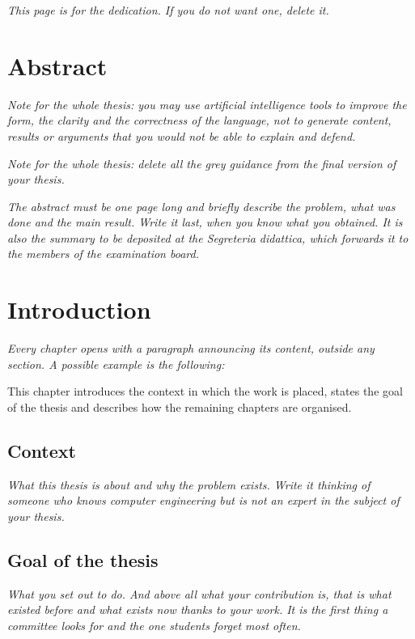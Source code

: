 \documentclass[12pt,a4paper,oneside]{report}
\newcommand{\guida}[1]{{\itshape\color{gray}#1\par}}
\newcommand{\esempio}[1]{#1\par}
\begin{document}


\thispagestyle{empty}
\guida{This page is for the dedication. If you do not want one, delete it.}
\clearpage
\setcounter{page}{1}

\tableofcontents
\listoffigures
\listoftables

\chapter*{Abstract}
\guida{Note for the whole thesis: you may use artificial intelligence tools to improve the form, the clarity and the correctness of the language, not to generate content, results or arguments that you would not be able to explain and defend.}
\guida{Note for the whole thesis: delete all the grey guidance from the final
version of your thesis.}
\guida{The abstract must be one page long and briefly describe the problem, what was done and the main result. Write it last, when you know what you obtained. It is also the summary to be deposited at the Segreteria didattica, which forwards it to the members of the examination board.}

\chapter{Introduction}
\guida{Every chapter opens with a paragraph announcing its content, outside
any section. A possible example is the following:}
\esempio{This chapter introduces the context in which the work is placed,
states the goal of the thesis and describes how the remaining chapters are
organised.}

\section{Context}
\guida{What this thesis is about and why the problem exists. Write it thinking of someone
who knows computer engineering but is not an expert in the subject of your
thesis.}

\section{Goal of the thesis}
\guida{What you set out to do. And above all what your contribution is, that
is what existed before and what exists now thanks to your work. It is the
first thing a committee looks for and the one students forget most often.}
\end{document}
